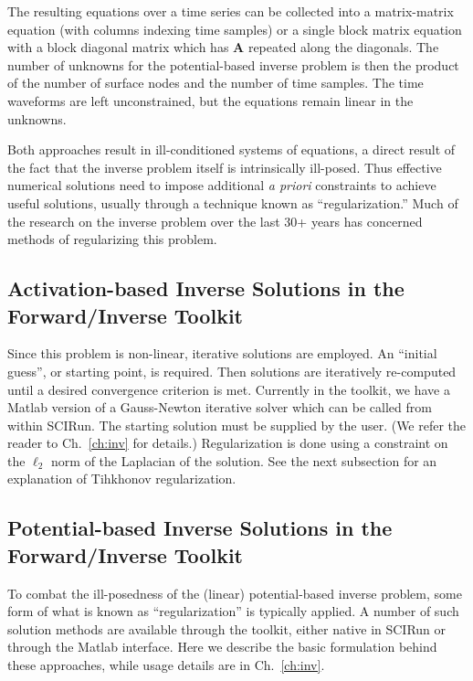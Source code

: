 The resulting equations over a time series can be collected into a
matrix-matrix equation (with columns indexing time samples) or a single
block matrix equation with a block diagonal matrix which has $\mathbf{A}$
repeated along the diagonals. The number of unknowns for the potential-based
inverse problem is then the product of the number of surface nodes and the
number of time samples. The time waveforms are left unconstrained, but
the equations remain linear in the unknowns.

Both approaches result in ill-conditioned systems of equations, a direct
result of the fact that the inverse problem itself is intrinsically
ill-posed. Thus effective numerical solutions need to impose additional
\textit{a priori} constraints to achieve useful solutions, usually through
a technique known as ``regularization.'' Much of the research on the
inverse problem over the last 30+ years has concerned methods of
regularizing this problem.

\subsection{Activation-based Inverse Solutions in the Forward/Inverse Toolkit}

Since this problem is non-linear, iterative solutions are employed. An
``initial guess'', or starting point, is required. Then
solutions are iteratively re-computed until a desired convergence criterion
is met. Currently in the toolkit, we have a Matlab version of a Gauss-Newton
iterative solver which can be called from within SCIRun. The starting
solution must be supplied by the user. (We refer the reader to
Ch.~\ref{ch:inv} for details.) Regularization is done using a constraint on
the $\ell_{2}$ norm of the Laplacian of the solution. See the next subsection
for an explanation of Tihkhonov regularization.

\subsection{Potential-based Inverse Solutions in the Forward/Inverse Toolkit}

To combat the ill-posedness of the (linear) potential-based inverse
problem, some form of what is known as ``regularization'' is typically
applied. A number of such solution methods are available through the
toolkit, either native in SCIRun or through the Matlab interface. Here we
describe the basic formulation behind these approaches, while usage details
are in Ch.~\ref{ch:inv}.

